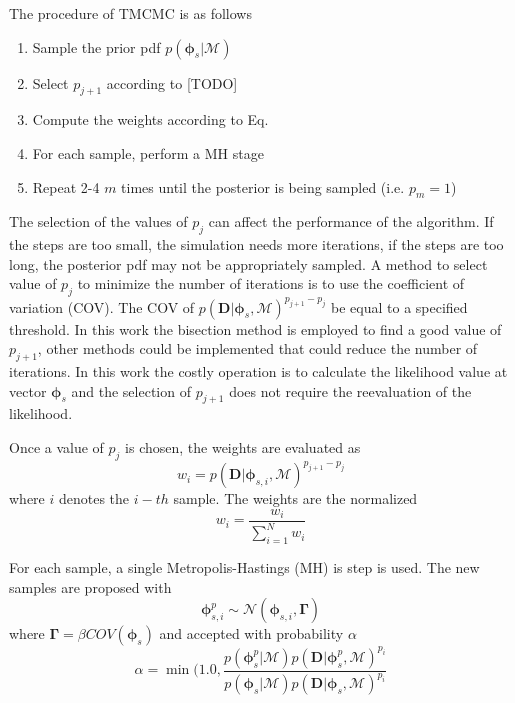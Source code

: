 \documentclass[]{elsarticle}
\renewcommand{\vec}[1]{\mathbf{#1}}
\begin{document}
The procedure of TMCMC is as follows
\begin{enumerate}
\item Sample the prior pdf $p( \vec{\phi}_s | \mathcal{M} )$
\item Select $p_{j+1}$ according to [TODO]
\item Compute the weights according to Eq.
\item For each sample, perform a MH stage
\item Repeat 2-4 $m$ times until the posterior is being sampled (i.e. $p_m = 1$)
\end{enumerate}


The selection of the values of $p_j$ can affect the performance of the algorithm. If the steps are too small, the simulation needs more iterations, if the steps are too long, the posterior pdf may not be appropriately sampled. A method to select value of $p_j$ to minimize the number of iterations is to use the coefficient of variation (COV). The COV of  $p( \vec{D} | \vec{\phi}_s , \mathcal{M} )^{p_{j+1}-p_j}$ be equal to a specified threshold. In this work the bisection method is employed to find a good value of $p_{j+1}$, other methods could be implemented that could reduce the number of iterations. In this work the costly operation is to calculate the likelihood value at vector $\vec{\phi}_s$ and the selection of $p_{j+1}$ does not require the reevaluation of the likelihood. 

Once a value of $p_j$ is chosen, the weights are evaluated as
\begin{equation}
w_i = p( \vec{D} | \vec{\phi}_{s,i} , \mathcal{M} )^{p_{j+1}-p_j}
\end{equation}
where $i$ denotes the $i-th$ sample. The weights are the normalized
\begin{equation}
w_i = \frac{w_i}{\sum\limits_{i=1}^N w_i}
\end{equation}

For each sample, a single Metropolis-Hastings (MH) is step is used. The new samples are proposed with
\begin{equation}
\vec{\phi}_{s,i}^{p} \sim \mathcal{N}\left( \vec{\phi}_{s,i}, \vec{\Gamma} \right)
\end{equation}
where $\vec{\Gamma} = \beta COV(  \vec{\phi}_{s} )$
and accepted with probability $\alpha$ 
\begin{equation}
\alpha = \min(1.0, \frac{p( \vec{\phi}_s^p | \mathcal{M} ) p( \vec{D} | \vec{\phi}_s^p , \mathcal{M} )^{p_i}}{p( \vec{\phi}_s | \mathcal{M} ) p( \vec{D} | \vec{\phi}_s , \mathcal{M} )^{p_i}}
\end{equation}
\end{document}
